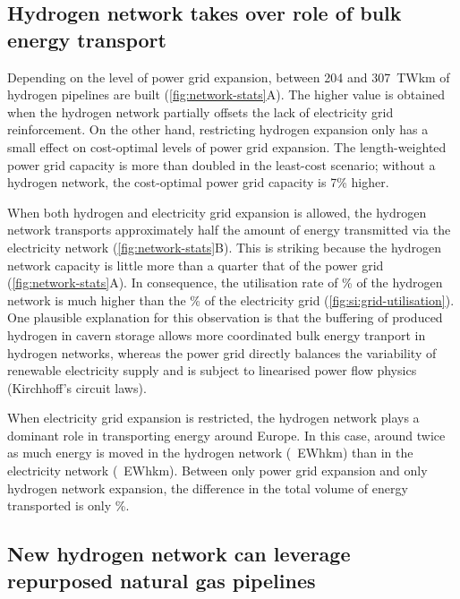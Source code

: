 \subsection*{Hydrogen network takes over role of bulk energy transport}
\label{sec:energy-moved}

Depending on the level of power grid expansion, between 204 and 307~TWkm of
hydrogen pipelines are built (\cref{fig:network-stats}A). The higher value
is obtained when the hydrogen network partially offsets the lack of electricity
grid reinforcement. On the other hand, restricting hydrogen expansion only has a
small effect on cost-optimal levels of power grid expansion. The length-weighted
power grid capacity is more than doubled in the least-cost scenario; without a
hydrogen network, the cost-optimal power grid capacity is 7\% higher.

When both hydrogen and electricity grid expansion is allowed, the hydrogen
network transports approximately half the amount of energy transmitted via the
electricity network (\cref{fig:network-stats}B). This is striking because
the hydrogen network capacity is little more than a quarter that of the power
grid (\cref{fig:network-stats}A). In consequence, the utilisation rate of
\utilisationHy\% of the hydrogen network is much higher than the
\utilisationAC\% of the electricity grid (\cref{fig:si:grid-utilisation}). One
plausible explanation for this observation is that the buffering of produced
hydrogen in cavern storage allows more coordinated bulk energy tranport in
hydrogen networks, whereas the power grid directly balances the variability of
renewable electricity supply and is subject to linearised power flow physics
(Kirchhoff's circuit laws).

When electricity grid expansion is restricted, the hydrogen network plays a
dominant role in transporting energy around Europe. In this case, around twice
as much energy is moved in the hydrogen network (\ewhkmhydrogen~EWhkm) than in
the electricity network (\ewhkmelectricity~EWhkm). Between only power grid
expansion and only hydrogen network expansion, the difference in the total
volume of energy transported is only \ewhkmdiff\%.

\subsection*{New hydrogen network can leverage repurposed natural gas pipelines}
\label{sec:repurposed}

